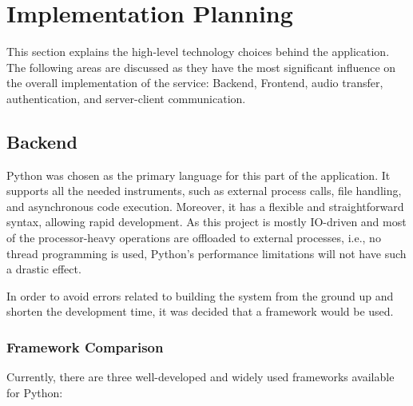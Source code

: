 \chapter{Implementation Planning}\label{ch:planning}

This section explains the high-level technology choices behind the application.
The following areas are discussed as they have the most significant influence on the overall implementation of the service:
Backend, Frontend, audio transfer, authentication, and server-client communication.


\section{Backend}
Python\cite{python} was chosen as the primary language for this part of the application.
It supports all the needed instruments, such as external process calls,
file handling, and asynchronous code execution. Moreover, it has a flexible and straightforward
syntax, allowing rapid development.
As this project is mostly IO-driven and most of the processor-heavy operations are offloaded to external processes,
i.e., no thread programming is used, Python's performance limitations\cite{gil} will not have such a drastic effect.

In order to avoid errors related to building the system from the ground up
and shorten the development time, it was decided that a framework would be used.

\subsection{Framework Comparison}
Currently, there are three well-developed and widely used frameworks available for Python:

